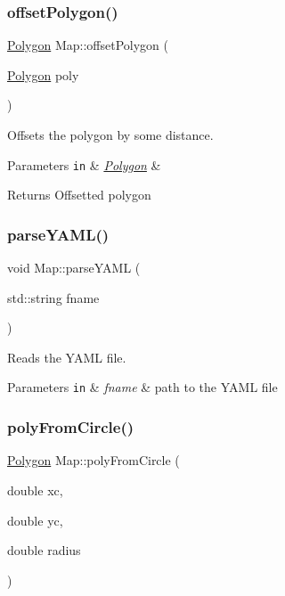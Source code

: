 \subsubsection{\texorpdfstring{offset\+Polygon()}{offsetPolygon()}}
{\footnotesize\ttfamily \hyperlink{class_polygon}{Polygon} Map\+::offset\+Polygon (\begin{DoxyParamCaption}\item[{\hyperlink{class_polygon}{Polygon}}]{poly }\end{DoxyParamCaption})}



Offsets the polygon by some distance. 


\begin{DoxyParams}[1]{Parameters}
\mbox{\tt in}  & {\em \hyperlink{class_polygon}{Polygon}} & \\
\hline
\end{DoxyParams}
\begin{DoxyReturn}{Returns}
Offsetted polygon 
\end{DoxyReturn}
\mbox{\label{class_map_acdd30d3fa51e3d444985845bc399c465}} 
\subsubsection{\texorpdfstring{parse\+Y\+A\+M\+L()}{parseYAML()}}
{\footnotesize\ttfamily void Map\+::parse\+Y\+A\+ML (\begin{DoxyParamCaption}\item[{std\+::string}]{fname }\end{DoxyParamCaption})}



Reads the Y\+A\+ML file. 


\begin{DoxyParams}[1]{Parameters}
\mbox{\tt in}  & {\em fname} & path to the Y\+A\+ML file \\
\hline
\end{DoxyParams}
\mbox{\label{class_map_add3430fc86a2dc8c423f470ddbc73736}} 
\subsubsection{\texorpdfstring{poly\+From\+Circle()}{polyFromCircle()}}
{\footnotesize\ttfamily \hyperlink{class_polygon}{Polygon} Map\+::poly\+From\+Circle (\begin{DoxyParamCaption}\item[{double}]{xc,  }\item[{double}]{yc,  }\item[{double}]{radius }\end{DoxyParamCaption})}



